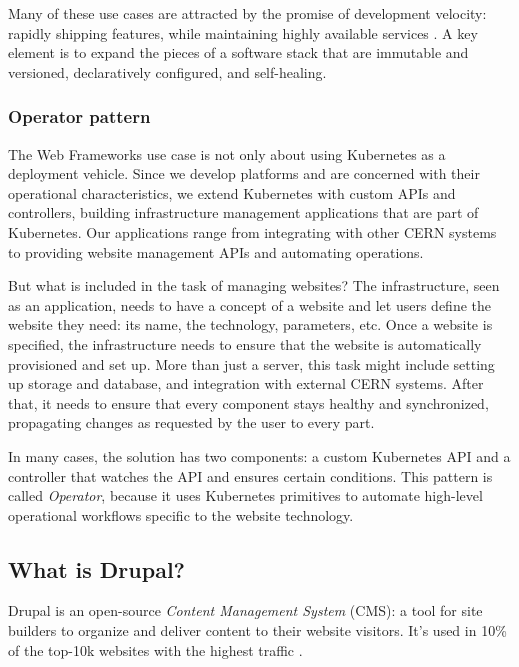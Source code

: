 Many of these use cases are attracted by the promise of development velocity:
rapidly shipping features, while maintaining highly available services \cite{hightowerKubernetesRunningDive2017}.
A key element is to expand the pieces of a software stack that are immutable and versioned, declaratively configured, and self-healing.

\subsubsection*{Operator pattern}
\label{sec-operators}

The Web Frameworks use case is not only about using Kubernetes as a deployment vehicle.
Since we develop platforms and are concerned with their operational characteristics,
we extend Kubernetes with custom APIs and controllers, building infrastructure management applications that are part of Kubernetes.
Our applications range from integrating with other CERN systems to providing website management APIs and automating operations.

But what is included in the task of managing websites?
The infrastructure, seen as an application, needs to have a concept of a website and let users define the website they need: its name, the technology, parameters, etc.
Once a website is specified, the infrastructure needs to ensure that the website is automatically provisioned and set up.
More than just a server, this task might include setting up storage and database, and integration with external CERN systems.
After that, it needs to ensure that every component stays healthy and synchronized, propagating changes as requested by the user to every part.

In many cases, the solution has two components: a custom Kubernetes API and a controller that watches the API and ensures certain conditions.
This pattern is called \emph{Operator}, because it uses Kubernetes primitives to automate high-level operational workflows specific to the website technology.

\subsection{What is Drupal?}
\label{what-is-drupal}

Drupal is an open-source \emph{Content Management System} (CMS): a tool for site builders to organize and deliver content to their website visitors.
It's used in 10\% of the top-10k websites with the highest traffic \cite{builtwithptyltdOpenSourceUsage,q-successdigelbmanngmbhWordPressVsDrupal}.

